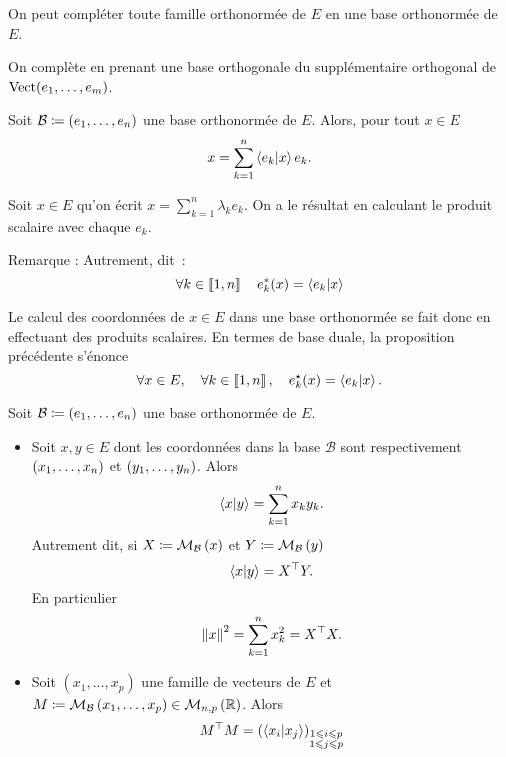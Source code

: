 \documentclass{magnolia}
\begin{document}
\begin{proposition}[utile=-3,nom={Théorème de la base incomplète}]
On peut compléter toute famille orthonormée de $E$ en une base orthonormée de $E$.
\end{proposition}

\begin{preuve}
On complète en prenant une base orthogonale du supplémentaire orthogonal de $\operatorname{Vect}(e_1,\ldots,e_m)$.
\end{preuve}

\begin{proposition}[utile=-3]
Soit $\mathcal{B}\coloneqq\left(e_1,\ldots,e_n\right)$ une base orthonormée de $E$. Alors, pour
tout $x\in E$
\[x=\sum_{k=1}^n \left\langle {e_k}\middle|{x}\right\rangle e_k.\]
\end{proposition}

\begin{preuve}
Soit $x\in E$ qu'on écrit $x=\sum_{k=1}^n \lambda_k e_k$. On a le résultat en calculant le produit scalaire avec chaque $e_k$.
\end{preuve}

\begin{sol}
Remarque : 
Autrement, dit~:
 \[\forall k\in\left\llbracket 1,n\right\rrbracket \quad e_k^*(x)=\left\langle {e_k}\middle|{x}\right\rangle\]
\end{sol}

\begin{remarques}
\remarque Le calcul des coordonnées de $x\in E$ dans une base orthonormée se fait
  donc en effectuant des produits scalaires.
\remarque En termes de base duale, la proposition précédente s'énonce
  \[\forall x\in E,\quad \forall k\in\left\llbracket 1,n\right\rrbracket,\quad e_k^{\star}(x)=\left\langle {e_k}\middle|{x}\right\rangle.\]
\end{remarques}

\begin{proposition}[utile=-3]
Soit $\mathcal{B}\coloneqq\left(e_1,\ldots,e_n\right)$ une base orthonormée de $E$.
\begin{itemize}
\item Soit $x,y\in E$ dont les coordonnées dans la base $\mathcal{B}$ sont
  respectivement $\left(x_1,\ldots,x_n\right)$ et $\left(y_1,\ldots,y_n\right)$. Alors
  \[\left\langle {x}\middle|{y}\right\rangle=\sum_{k=1}^n x_k y_k.\]
  Autrement dit, si $X\coloneqq\mathcal{M}_{\mathcal{B}}\left(x\right)$ et $Y\coloneqq\mathcal{M}_{\mathcal{B}}\left(y\right)$
  \[\left\langle {x}\middle|{y}\right\rangle={X}^{\top}Y.\]
  En particulier
  \[\left\|x\right\|^2=\sum_{k=1}^n x_k^2={X}^{\top}X.\]
\item Soit $(x_1,\ldots,x_p)$ une famille de vecteurs de $E$ et
  $M\coloneqq\mathcal{M}_{\mathcal{B}}\left(x_1,\ldots,x_p\right)\in\mathcal{M}_{n,p}\left(\mathbb{R}\right)$. Alors
  \[{M}^{\top}M=\left(\left\langle {x_i}\middle|{x_j}\right\rangle\right)_{\substack{1\leqslant i\leqslant p\\ 1\leqslant j\leqslant p}}\]
\end{itemize}
\end{proposition}
\end{document}
